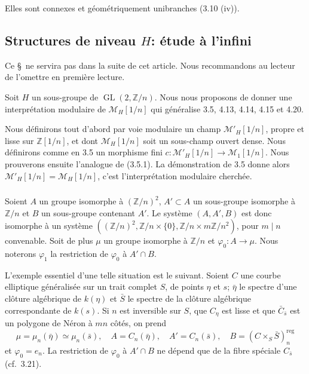 \documentclass[11pt,a4paper]{amsart}
\theoremstyle{plain}
\theoremstyle{definition}
\DeclareMathOperator{\reg}{reg}
\DeclareMathOperator{\Gl}{GL}
\newcommand{\mll}{\mathcal{M}}
\newcommand{\ZZ}{\mathbb{Z}}
\begin{document}
Elles sont connexes et g\'eom\'etriquement unibranches (3.10 (iv)).


\subsection{Structures de niveau $H$: \'etude \`a l'infini}

Ce \S\ ne servira pas dans la suite de cet article. Nous recommandons au lecteur de l'omettre en premi\`ere lecture.

Soit $H$ un sous-groupe de $\Gl(2, \ZZ/n)$. Nous nous proposons de donner une interpr\'etation modulaire de $\mll_H[1/n]$ qui g\'en\'eralise 3.5, 4.13, 4.14, 4.15 et 4.20.

Nous d\'efinirons tout d'abord par voie modulaire un champ $\mll'_H[1/n]$, propre et lisse sur $\ZZ[1/n]$, et dont $\mll_H[1/n]$ soit un sous-champ ouvert dense. Nous d\'efinirons comme en 3.5 un morphisme fini $c \colon \mll'_H[1/n] \to \mll_1[1/n]$. Nous prouverons ensuite l'analogue de (3.5.1). La d\'emonstration de 3.5 donne alors $\mll'_H[1/n] = \mll_H[1/n]$, c'est l'interpr\'etation modulaire cherch\'ee.

\subsubsection{}
Soient $A$ un groupe isomorphe \`a $(\ZZ/n)^2$, $A' \subset A$ un sous-groupe isomorphe \`a $\ZZ/n$ et $B$ un sous-groupe contenant $A'$. Le syst\`eme $(A, A', B)$ est donc isomorphe \`a un syst\`eme $((\ZZ/n)^2, \ZZ/n \times \{0\}, \ZZ/n \times m\ZZ/n^2)$, pour $m \mid n$ convenable. Soit de plus $\mu$ un groupe isomorphe \`a $\ZZ/n$ et $\varphi_0 \colon A \to \mu$. Nous noterons $\varphi_1$ la restriction de $\varphi_0$ \`a $A' \cap B$.

L'exemple essentiel d'une telle situation est le suivant. Soient $C$ une courbe elliptique g\'en\'eralis\'ee sur un trait complet $S$, de points $\eta$ et $s$; $\bar{\eta}$ le spectre d'une cl\^oture alg\'ebrique de $k(\eta)$ et $\bar{S}$ le spectre de la cl\^oture alg\'ebrique correspondante de $k(s)$. Si $n$ est inversible sur $S$, que $C_{\eta}$ est lisse et que $\bar{C}_{\bar{s}}$ est un polygone de N\'eron \`a $mn$ c\^ot\'es, on prend
\[
\mu = \mu_n(\bar{\eta}) \simeq \mu_n(\bar{s}), \quad A = C_n(\bar{\eta}), \quad A' = C_n(\bar{s}), \quad B = (C \times_S \bar{S})^{\reg}_n
\]
et $\varphi_0 = e_n$. La restriction de $\varphi_0$ \`a $A' \cap B$ ne d\'epend que de la fibre sp\'eciale $C_{\bar{s}}$ (cf.~3.21).
\end{document}
